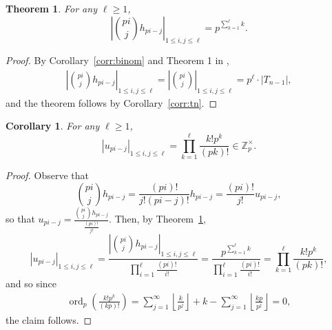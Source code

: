 \documentclass[letterpaper,oneside, 10pt]{amsart}
\newtheorem{theorem}[thm]{Theorem}
\newtheorem{corollary}[thm]{Corollary}
\theoremstyle{definition}
\numberwithin{equation}{section}
\newcommand{\Zptimes}{\mathbb{Z}_p^\times}
\DeclareMathOperator{\ordp}{ord}
\newcommand{\floor}[1]{\left \lfloor #1 \right \rfloor}
\begin{document}
\begin{theorem}\label{thm:hpij_det}
For any $\ell\geq 1$,
\[
	|\binom{pi}{j}h_{pi-j}|_{1\leq i,j\leq \ell} = p^{\sum_{k=1}^\ell k}.
\]
\end{theorem}
\begin{proof}
By Corollary~\ref{corr:binom} and Theorem 1 in \cite{Tonne},
\begin{align*}
|\binom{pi}{j}h_{pi-j}|_{1\leq i,j\leq \ell} = |\binom{pi}{j}|_{1\leq i,j\leq \ell} = p^\ell\cdot |T_{n-1}|,
\end{align*}
and the theorem follows by Corollary~\ref{corr:tn}.
\end{proof}

\begin{corollary}\label{corr:hass_nonzero}
For any $\ell\geq 1$,
\[
	|u_{pi-j}|_{1\leq i,j\leq \ell} = \prod_{k=1}^\ell\frac{k!p^k}{(pk)!}\in\Zptimes.
\]
\end{corollary}
\begin{proof}
Observe that 
\[
	\binom{pi}{j}h_{pi-j} = \frac{(pi)!}{j!(pi-j)!}h_{pi-j} = \frac{(pi)!}{j!}u_{pi-j},
\]
so that $u_{pi-j} = \frac{\binom{pi}{j}h_{pi-j}}{\frac{(pi)!}{j!}}$. Then, by Theorem~\ref{thm:hpij_det}, 
\[
	|u_{pi-j}|_{1\leq i,j\leq \ell} = \frac{|\binom{pi}{j}h_{pi-j}|_{1\leq i,j\leq \ell}}{\prod_{i=1}^\ell \frac{(pi)!}{i!}}=\frac{p^{\sum_{k=1}^\ell k}}{\prod_{i=1}^\ell \frac{(pi)!}{i!}}=\prod_{k=1}^\ell\frac{k!p^k}{(pk)!},
\]
and so since
\begin{align*}
\ordp_p\left( \frac{k!p^k}{(kp)!}\right)= \sum_{j=1}^\infty\floor{\frac{k}{p^j}}+k-\sum_{j=1}^\infty\floor{\frac{kp}{p^j}}=0,
\end{align*}
the claim follows.
\end{proof}
\end{document}
